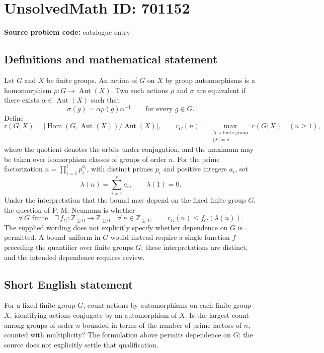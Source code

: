 \documentclass[11pt]{article}
\newcommand{\Z}{\mathbb{Z}}
\begin{document}
\section*{UnsolvedMath ID: 701152}
\textbf{Source problem code:} catalogue entry
\subsection{Definitions and mathematical statement}
Let \(G\) and \(X\) be finite groups. An action of \(G\) on \(X\) by group automorphisms is a homomorphism \(\rho:G\to\operatorname{Aut}(X)\). Two such actions \(\rho\) and \(\sigma\) are equivalent if there exists \(\alpha\in\operatorname{Aut}(X)\) such that
\[
\sigma(g)=\alpha\rho(g)\alpha^{-1}\qquad\text{for every }g\in G.
\]
Define
\[
r(G;X)=\left|\operatorname{Hom}(G,\operatorname{Aut}(X))/\operatorname{Aut}(X)\right|,
\qquad
r_G(n)=\max_{\substack{X\text{ a finite group}\\|X|=n}}r(G;X)
\quad(n\geq1),
\]
where the quotient denotes the orbits under conjugation, and the maximum may be taken over isomorphism classes of groups of order \(n\). For the prime factorization \(n=\prod_{i=1}^{t}p_i^{a_i}\), with distinct primes \(p_i\) and positive integers \(a_i\), set
\[
\lambda(n)=\sum_{i=1}^{t}a_i,\qquad\lambda(1)=0.
\]
Under the interpretation that the bound may depend on the fixed finite group \(G\), the question of P. M. Neumann is whether
\[
\forall\,G\text{ finite}\quad
\exists\,f_G:\Z_{\geq0}\to\Z_{\geq0}\quad
\forall\,n\in\Z_{\geq1},\qquad
r_G(n)\leq f_G(\lambda(n)).
\]
The supplied wording does not explicitly specify whether dependence on \(G\) is permitted. A bound uniform in \(G\) would instead require a single function \(f\) preceding the quantifier over finite groups \(G\); these interpretations are distinct, and the intended dependence requires review.
\subsection{Short English statement}
For a fixed finite group \(G\), count actions by automorphisms on each finite group \(X\), identifying actions conjugate by an automorphism of \(X\). Is the largest count among groups of order \(n\) bounded in terms of the number of prime factors of \(n\), counted with multiplicity? The formulation above permits dependence on \(G\); the source does not explicitly settle that qualification.
\end{document}
